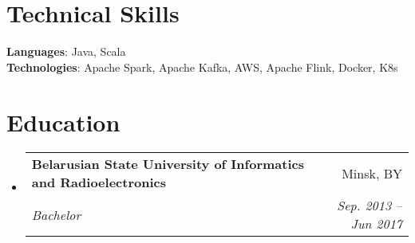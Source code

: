 \documentclass[letterpaper,11pt]{article}
\makeatletter
\newcommand{\resumeSubheading}[4]{
  \vspace{-2pt}\item
    \begin{tabular*}{0.97\textwidth}[t]{l@{\extracolsep{\fill}}r}
      \textbf{#1} & #2 \\
      \textit{\small#3} & \textit{\small #4} \\
    \end{tabular*}\vspace{-7pt}
}
\newcommand{\resumeSubHeadingListStart}{\begin{itemize}[leftmargin=0.15in, label={}]}
\newcommand{\resumeSubHeadingListEnd}{\end{itemize}}
\makeatother
\begin{document}
\section{Technical Skills}
 \begin{itemize}[leftmargin=0.15in, label={}]
    \small{\item{
     \textbf{Languages}{: Java, Scala} \\
     \textbf{Technologies}{: Apache Spark, Apache Kafka, AWS, Apache Flink, Docker, K8s} \\
    }}
 \end{itemize}
 
\section{Education}
  \resumeSubHeadingListStart
    \resumeSubheading
      {Belarusian State University of Informatics and Radioelectronics }{Minsk, BY}
      {Bachelor}{Sep. 2013 -- Jun 2017}
  \resumeSubHeadingListEnd

\end{document}
